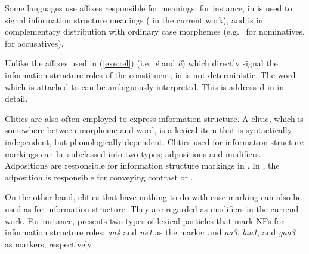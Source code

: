 \noindent Some languages use affixes responsible for  meanings;
for instance, \nun in  is used to signal information structure
meanings ( in the current work), and is in
complementary distribution with ordinary case morphemes (e.g.\ \ika
for nominatives, \lul for accusatives).






\noindent Unlike the  affixes used in (\ref{exe:rel})
(i.e.\ \textit{{\'e}} and \textit{{\'a}}) which directly signal the
information structure roles of the constituent, \nun in 
is not deterministic. The word which \nun is attached to can be
ambiguously interpreted. This is addressed in  in
detail.




Clitics are also often employed to express information structure. A
clitic, which is somewhere between morpheme and word, is a lexical
item that is syntactically independent, but phonologically dependent.
Clitics used for information structure markings can be subclassed into
two types; adpositions and modifiers. Adpositions are responsible for
information structure markings in . In
, the adposition \wa is responsible for conveying
contrast or .






\noindent On the other hand, clitics that have nothing to do with case
marking can also be used as  for information
structure. They are regarded as modifiers in the currend work. For
instance, \citet{man:07} presents two types of  lexical
particles that mark NPs for information structure roles: \textit{aa4}
and \textit{ne1} as the  marker and \textit{aa3}, \textit{laa1},
and \textit{gaa3} as  markers, respectively.



